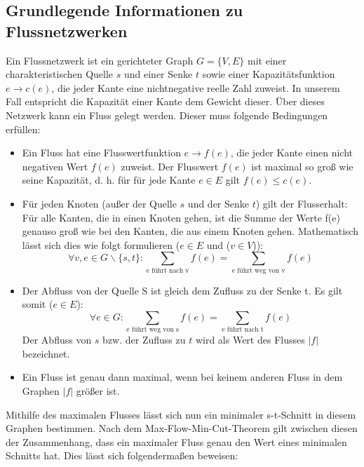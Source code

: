 \documentclass[a4paper, notitlepage, 12pt]{scrartcl}
\begin{document}
 \subsection{Grundlegende Informationen zu Flussnetzwerken}
Ein Flussnetzwerk ist ein gerichteter Graph $G = \{V,E\}$ mit einer charakteristischen Quelle $s$ und einer Senke $t$ sowie einer Kapazitätsfunktion $e \rightarrow c(e)$, die jeder Kante eine nichtnegative reelle Zahl zuweist. In unserem Fall entspricht die Kapazität einer Kante dem Gewicht dieser.
Über dieses Netzwerk kann ein Fluss gelegt werden. Dieser muss folgende Bedingungen erfüllen:
\begin{itemize}
 \item Ein Fluss hat eine Flusswertfunktion $e \rightarrow f(e)$, die jeder Kante einen nicht negativen Wert $f(e)$ zuweist. Der Flusswert $f(e)$ ist maximal so groß wie seine Kapazität, d. h. für für jede Kante $e \in E$ gilt $f(e) \leq c(e)$.
\item Für jeden Knoten (außer der Quelle $s$ und der Senke $t$) gilt der Flusserhalt: Für alle Kanten, die in einen Knoten gehen, ist die Summe der Werte f(e) genauso groß wie bei den Kanten, die aus einem Knoten gehen. Mathematisch lässt sich dies wie folgt formulieren ($e \in E$ und ($v \in V$)):
\begin{equation} \forall v,e \in G\backslash\{s,t\} : \sum_{\text{e führt nach v}} f(e) = \sum_{\text{e führt weg von v}} f(e) \end{equation}
\item Der Abfluss von der Quelle S ist gleich dem Zufluss zu der Senke t. Es gilt somit ($e \in E$):
\begin{equation} \forall e \in G : \sum_{\text{e führt weg von s}} f(e) = \sum_{\text{e führt nach t}} f(e) \end{equation}
Der Abfluss von $s$ bzw. der Zufluss zu $t$ wird als Wert des Flusses $|f|$ bezeichnet.
\item  Ein Fluss ist genau dann maximal, wenn bei keinem anderen Fluss in dem Graphen $|f|$ größer ist.
\end{itemize}
Mithilfe des maximalen Flusses lässt sich nun ein minimaler s-t-Schnitt in diesem Graphen bestimmen. Nach dem Max-Flow-Min-Cut-Theorem gilt zwischen diesen der Zusammenhang, dass ein maximaler Fluss genau den Wert eines minimalen Schnitts hat. Dies lässt sich folgendermaßen beweisen:
\end{document}
